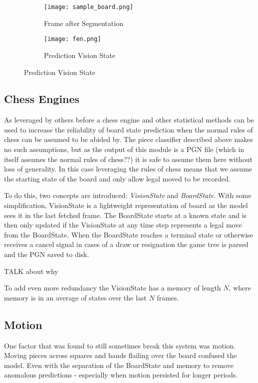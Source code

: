 \begin{figure}[h]
    \centering
    \begin{subfigure}[b]{0.48\textwidth}
        \centering
        \texttt{[image: sample\_board.png]}
        \caption{Frame after Segmentation}
    \end{subfigure}
    \hfill
    \begin{subfigure}[b]{0.48\textwidth}
        \centering
        \texttt{[image: fen.png]}
        \caption{Prediction Vision State}
    \end{subfigure}
\label{fig:visionstate}
\end{figure}

\subsection{Chess Engines}
As leveraged by others before \cite{} a chess engine and other statistical methods \cite{} can be used to increase the reliability of board state 
prediction when the normal rules of chess can be assumed to be abided by.  The piece classifier described above makes no such assumptions, but as 
the output of this module is a PGN file (which in itself assumes the normal rules of chess??) it is safe to assume them here without loss of 
generality.  In this case leveraging the rules of chess means that we assume the starting state of the board and only allow legal moved to be recorded.

To do this, two concepts are introduced: \textit{VisionState} and \textit{BoardState}.  With some simplification, VisionState is a lightweight 
representation of board as the model sees it in the last fetched frame.  The BoardState starts at a known state and is then only updated if the VisionState at 
any time step represents a legal move from the BoardState. When the BoardState reaches a terminal state or otherwise receives a cancel signal in cases of a 
draw or resignation the game tree is parsed and the PGN saved to disk.

TALK about why

To add even more redundancy the VisionState has a memory of length $N$, where memory is in an average of states over the last $N$ frames.

\subsection{Motion}
One factor that was found to still sometimes break this system was motion.  Moving pieces across squares and hands flailing over the board confused the
model.  Even with the separation of the BoardState and memory to remove anomalous predictions - especially when motion persisted for longer periods.  

